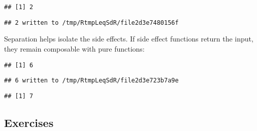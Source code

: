 \documentclass[]{book}
\newenvironment{Shaded}{\begin{snugshade}}{\end{snugshade}}
\newcommand{\DecValTok}[1]{\textcolor[rgb]{0.00,0.00,0.81}{#1}}
\newcommand{\KeywordTok}[1]{\textcolor[rgb]{0.13,0.29,0.53}{\textbf{#1}}}
\newcommand{\NormalTok}[1]{#1}
\newcommand{\OperatorTok}[1]{\textcolor[rgb]{0.81,0.36,0.00}{\textbf{#1}}}
\newcommand{\StringTok}[1]{\textcolor[rgb]{0.31,0.60,0.02}{#1}}
\begin{document}
\begin{verbatim}
## [1] 2
\end{verbatim}

\begin{verbatim}
## 2 written to /tmp/RtmpLeqSdR/file2d3e7480156f
\end{verbatim}

Separation helps isolate the side effects.
If side effect functions return the input, they remain composable with pure functions:

\begin{Shaded}
\end{Shaded}

\begin{verbatim}
## [1] 6
\end{verbatim}

\begin{verbatim}
## 6 written to /tmp/RtmpLeqSdR/file2d3e723b7a9e
\end{verbatim}

\begin{verbatim}
## [1] 7
\end{verbatim}

\hypertarget{exercises-17}{%
\subsection{Exercises}\label{exercises-17}}
\end{document}

